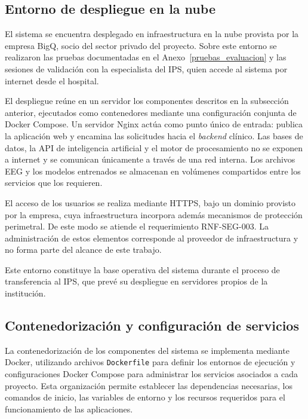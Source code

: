 \subsection{Entorno de despliegue en la nube}
\label{subsec:despliegue-nube}

El sistema se encuentra desplegado en infraestructura en la nube provista por la empresa BigQ, socio del sector privado del proyecto.
Sobre este entorno se realizaron las pruebas documentadas en el Anexo~\ref{pruebas_evaluacion} y las sesiones de validación con la especialista del IPS, quien accede al sistema por internet desde el hospital.

El despliegue reúne en un servidor los componentes descritos en la subsección anterior, ejecutados como contenedores mediante una configuración conjunta de Docker Compose.
Un servidor Nginx actúa como punto único de entrada: publica la aplicación web y encamina las solicitudes hacia el \textit{backend} clínico.
Las bases de datos, la API de inteligencia artificial y el motor de procesamiento no se exponen a internet y se comunican únicamente a través de una red interna.
Los archivos EEG y los modelos entrenados se almacenan en volúmenes compartidos entre los servicios que los requieren.

El acceso de los usuarios se realiza mediante HTTPS, bajo un dominio provisto por la empresa, cuya infraestructura incorpora además mecanismos de protección perimetral.
De este modo se atiende el requerimiento RNF-SEG-003.
La administración de estos elementos corresponde al proveedor de infraestructura y no forma parte del alcance de este trabajo.

Este entorno constituye la base operativa del sistema durante el proceso de transferencia al IPS, que prevé su despliegue en servidores propios de la institución.

\subsection{Contenedorización y configuración de servicios}

La contenedorización de los componentes del sistema se implementa
mediante Docker, utilizando archivos \texttt{Dockerfile} para definir los
entornos de ejecución y configuraciones Docker Compose para
administrar los servicios asociados a cada proyecto. Esta
organización permite establecer las dependencias necesarias,
los comandos de inicio, las variables de entorno y los recursos
requeridos para el funcionamiento de las aplicaciones.

